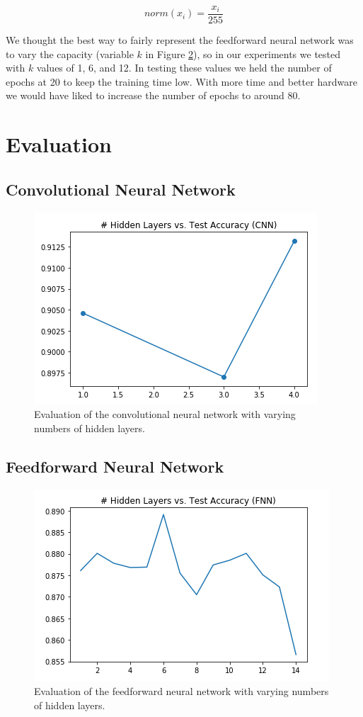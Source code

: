 \documentclass[conference]{IEEEtran}
\begin{document}
$$ norm(x_i) = \frac{x_i}{255}$$

We thought the best way to fairly represent the feedforward neural network was to vary the capacity (variable $k$ in Figure \ref{fig:fnn_dia}), so in our experiments we tested with $k$ values of 1, 6, and 12. In testing these values we held the number of epochs at 20 to keep the training time low. With more time and better hardware we would have liked to increase the number of epochs to around 80. 

\section{Evaluation}

\subsection{Convolutional Neural Network}

\begin{figure}[h!] 
\centering
  \includegraphics[scale=.5]{cNN_eval.png}
  \caption{Evaluation of the convolutional neural network with varying numbers of hidden layers.}
  \label{fig:fnn_dia}
\end{figure}


\subsection{Feedforward Neural Network}

\begin{figure}[h!] 
\centering
  \includegraphics[scale=.5]{fNN_eval.png}
  \caption{Evaluation of the feedforward neural network with varying numbers of hidden layers.}
  \label{fig:fnn_dia}
\end{figure}
\end{document}
